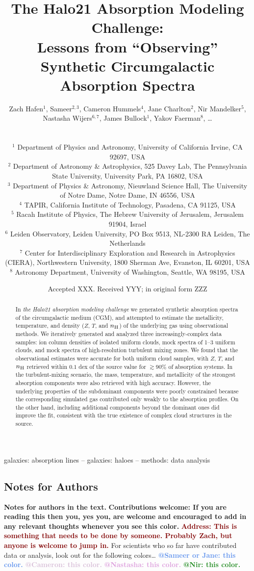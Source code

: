 \documentclass[fleqn,usenatbib]{mnras}
\title[``Observing'' Synthetic Circumgalactic Absorption Spectra]{The Halo21 Absorption Modeling Challenge:\\Lessons from ``Observing'' Synthetic Circumgalactic Absorption Spectra}
\author[Hafen, Sameer, et al.]{
\parbox{\textwidth}{
Zach Hafen$^{1}$,
Sameer$^{2,3}$,
Cameron Hummels$^4$,
Jane Charlton$^2$,
Nir Mandelker$^5$,
Nastasha Wijers$^{6, 7}$,
James Bullock$^{1}$,
Yakov Faerman$^{8}$,
\ldots
} \vspace{0.4cm}\\
\parbox{\textwidth}{
$^1$ Department of Physics and Astronomy, University of California Irvine, CA 92697, USA \\
$^{2}$ Department of Astronomy \& Astrophysics, 525 Davey Lab, The Pennsylvania State University, University Park, PA 16802, USA \\
$^{3}$ Department of Physics \& Astronomy, Nieuwland Science Hall, The University of Notre Dame, Notre Dame, IN 46556, USA \\
$^4$ TAPIR, California Institute of Technology, Pasadena, CA 91125, USA \\
$^5$ Racah Institute of Physics, The Hebrew University of Jerusalem,
Jerusalem 91904, Israel \\
$^6$ Leiden Observatory, Leiden University, PO Box 9513, NL-2300 RA Leiden, The Netherlands \\
$^7$ Center for Interdisciplinary Exploration and Research in Astrophysics (CIERA), Northwestern University, 1800 Sherman Ave, Evanston, IL 60201, USA \\
$^8$ Astronomy Department, University of Washington, Seattle, WA
98195, USA
}
}
\date{Accepted XXX. Received YYY; in original form ZZZ}
\makeatletter
\newcommand{\thoughts}[1]{\textcolor{BurntOrange}{\textbf{Contributions welcome: #1}}}
\newcommand{\todo}[1]{\textcolor{Maroon}{\textbf{Address: #1}}}
\newcommand{\atsameer}[1]{\textcolor{CornflowerBlue}{\textbf{@Sameer or Jane: #1}}}
\newcommand{\atcameron}[1]{\textcolor{Thistle}{\textbf{@Cameron: #1}}}
\newcommand{\atnastasha}[1]{\textcolor{Plum}{\textbf{@Nastasha: #1}}}
\newcommand{\atnir}[1]{\textcolor{ForestGreen}{\textbf{@Nir: #1}}}
\makeatother
\begin{document}
\label{firstpage}
\pagerange{\pageref{firstpage}--\pageref{lastpage}}
\maketitle

\begin{abstract}
In \textit{the Halo21 absorption modeling challenge} we generated synthetic absorption spectra of the circumgalactic medium (CGM),
and attempted to estimate the metallicity, temperature, and density ($Z$, $T$, and $n_{\rm H}$) of the underlying gas using observational methods.
We iteratively generated and analyzed three increasingly-complex data samples:
ion column densities of isolated uniform clouds,
mock spectra of 1--3 uniform clouds,
and mock spectra of high-resolution turbulent mixing zones.
We found that the observational estimates were accurate for both uniform cloud samples, with $Z$, $T$, and $n_{\rm H}$ retrieved within $0.1$ dex of the source value for $\gtrsim 90\%$ of absorption systems.
In the turbulent-mixing scenario, the mass, temperature, and metallicity of the strongest absorption components were also retrieved with high accuracy.
However, the underlying properties of the subdominant components were poorly constrained because the corresponding simulated gas contributed only weakly to the  absorption profiles.
On the other hand, including
additional components beyond the dominant ones did improve the fit, consistent with the true existence of complex cloud structures in the source. 
\end{abstract}

\begin{keywords}
galaxies: absorption lines -- galaxies: haloes -- methods: data analysis
\end{keywords}



\subsection{Notes for Authors}
 
\textbf{Notes for authors in the text.}
\thoughts{If you are reading this then you, yes you, are welcome and encouraged to add in any relevant thoughts whenever you see this color.}
\todo{This is something that needs to be done by someone. Probably Zach, but anyone is welcome to jump in.}
For scientists who so far have contributed data or analysis, look out for the following colors\ldots
\atsameer{this color.}
\atcameron{this color.}
\atnastasha{this color.}
\atnir{this color.}
\end{document}
